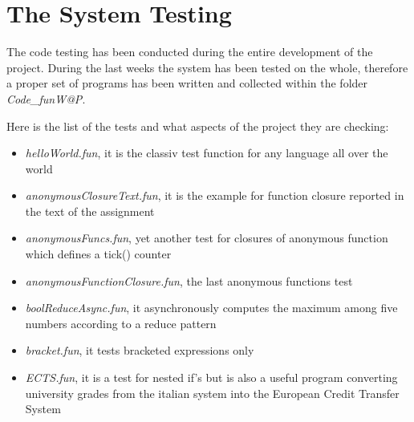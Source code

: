 \chapter{\label{chapter6} The System Testing}

The code testing has been conducted during the entire development of the project. During the last weeks the system has been tested on the whole, therefore a proper set of \fwap programs has been written and collected within the folder \textsl{Code_funW@P}. 

Here is the list of the tests and what aspects of the project they are checking:
\begin{itemize}
	\item \textit{helloWorld.fun}, it is the classiv test function for any language all over the world
	\item \textit{anonymousClosureText.fun}, it is the example for function closure reported in the text of the assignment \cite{exercise}
	\item \textit{anonymousFuncs.fun}, yet another test for closures of anonymous function which defines a tick() counter
	\item \textit{anonymousFunctionClosure.fun}, the last anonymous functions test
	\item \textit{boolReduceAsync.fun}, it asynchronously computes the maximum among five numbers according to a reduce pattern
	\item \textit{bracket.fun}, it tests bracketed expressions only
	\item \textit{ECTS.fun}, it is a test for nested if's but is also a useful program converting university grades from the italian system into the European Credit Transfer System \cite{ects}
\end{itemize}